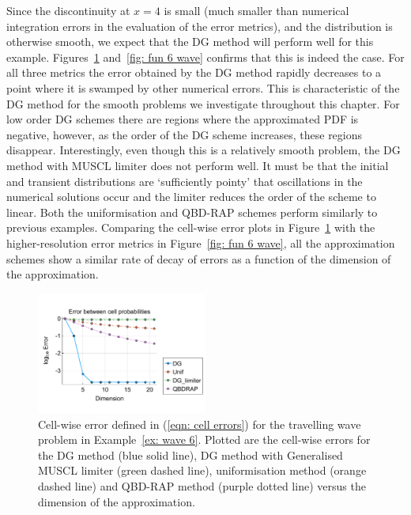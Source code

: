 \begin{example}
	Since the discontinuity at \(x=4\) is small (much smaller than numerical integration errors in the evaluation of the error metrics), and the distribution is otherwise smooth, we expect that the DG method will perform well for this example. Figures~\ref{fig: fun 6 wave cp} and~\ref{fig: fun 6 wave} confirms that this is indeed the case. For all three metrics the error obtained by the DG method rapidly decreases to a point where it is swamped by other numerical errors. This is characteristic of the DG method for the smooth problems we investigate throughout this chapter. For low order DG schemes there are regions where the approximated PDF is negative, however, as the order of the DG scheme increases, these regions disappear. Interestingly, even though this is a relatively smooth problem, the DG method with MUSCL limiter does not perform well. It must be that the initial and transient distributions are `sufficiently pointy' that oscillations in the numerical solutions occur and the limiter reduces the order of the scheme to linear. Both the uniformisation and QBD-RAP schemes perform similarly to previous examples. Comparing the cell-wise error plots in Figure~\ref{fig: fun 6 wave cp} with the higher-resolution error metrics in Figure~\ref{fig: fun 6 wave}, all the approximation schemes show a similar rate of decay of errors as a function of the dimension of the approximation. 
	\begin{figure}[h]
		\centering
		\includegraphics[width=0.5\textwidth,trim={0.75cm 0.8cm 0.25cm 1.25cm},clip]{chapter6/figs/wave/fun6/L1_cell_probs.pdf}
		\caption{Cell-wise error defined in (\ref{eqn: cell errors}) for the travelling wave problem in Example~\ref{ex: wave 6}. Plotted are the cell-wise errors for the DG method (blue solid line), DG method with Generalised MUSCL limiter (green dashed line), uniformisation method (orange dashed line) and QBD-RAP method (purple dotted line) versus the dimension of the approximation.}  
		\label{fig: fun 6 wave cp} 
	\end{figure}
	\begin{figure}[h]

\end{figure}
\end{example}
